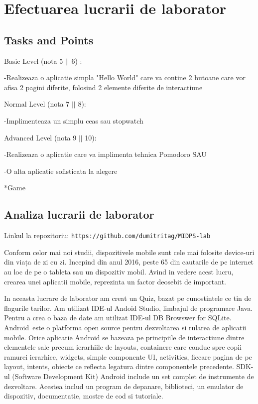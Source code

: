 \section{Efectuarea lucrarii de laborator}



\subsection{Tasks and Points}



Basic Level (nota 5 $||$ 6) : 

-Realizeaza o aplicatie simpla "Hello World" care va contine 2 butoane care vor afisa 2 pagini diferite, folosind 2 elemente diferite de interactiune


Normal Level (nota 7 $||$ 8):

-Implimenteaza un simplu ceas sau stopwatch


Advanced Level (nota 9 $||$ 10):

-Realizeaza o aplicatie care va implimenta tehnica Pomodoro SAU

-O alta aplicatie sofisticata la alegere

*Game

\subsection{Analiza lucrarii de laborator}


Linkul la repozitoriu: \texttt{https://github.com/dumitritag/MIDPS-lab}


Conform celor mai noi studii, dispozitivele mobile sunt cele mai folosite device-uri din viața de zi cu zi. Incepind din anul 2016, peste 65 din cautarile de pe internet au loc de pe o tableta sau un dispozitiv mobil. Avind in vedere acest lucru, crearea unei aplicatii mobile, reprezinta un factor deosebit de important.

In aceasta lucrare de laborator am creat un Quiz, bazat pe cunostintele ce tin de flagurile tarilor. Am utilizat IDE-ul Andoid Studio, limbajul de programare Java. Pentru a crea o baza de date am utilizat IDE-ul DB Browswer for SQLite. Android este o platforma open source pentru dezvoltarea si rularea de aplicatii mobile. Orice aplicatie Android se bazeaza pe principiile de interactiune dintre elementele sale precum ierarhiile de layouts, containere care conduc spre copii ramurei ierarhice, widgets, simple componente UI, activities, fiecare pagina de pe layout, intents, obiecte ce reflecta legatura dintre componentele precedente. SDK-ul (Software Development Kit) Android include un set complet de instrumente de dezvoltare. Acestea includ un program de depanare, biblioteci, un emulator de dispozitiv, documentatie, mostre de cod si tutoriale. 

